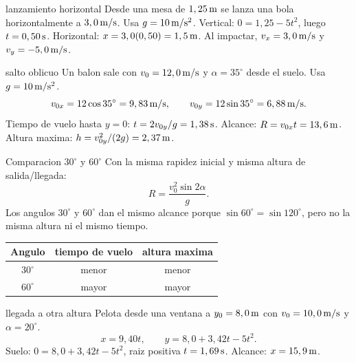 \documentclass[10pt,a4paper]{article}
\begin{document}
\begin{examplebox}{lanzamiento horizontal}
Desde una mesa de $1,25\,\mathrm{m}$ se lanza una bola horizontalmente a $3,0\,\mathrm{m/s}$. Usa $g=10\,\mathrm{m/s^2}$.
\solutionblock Vertical: $0=1,25-5t^2$, luego $t=0,50\,\mathrm{s}$. Horizontal: $x=3,0(0,50)=1,5\,\mathrm{m}$. Al impactar, $v_x=3,0\,\mathrm{m/s}$ y $v_y=-5,0\,\mathrm{m/s}$.
\end{examplebox}

\clearpage

\begin{examplebox}{salto oblicuo}
Un balon sale con $v_0=12,0\,\mathrm{m/s}$ y $\alpha=35^\circ$ desde el suelo. Usa $g=10\,\mathrm{m/s^2}$.
\solutionblock
\[
v_{0x}=12\cos35^\circ=9,83\,\mathrm{m/s},\qquad v_{0y}=12\sin35^\circ=6,88\,\mathrm{m/s}.
\]
Tiempo de vuelo hasta $y=0$: $t=2v_{0y}/g=1,38\,\mathrm{s}$. Alcance: $R=v_{0x}t=13,6\,\mathrm{m}$. Altura maxima: $h=v_{0y}^2/(2g)=2,37\,\mathrm{m}$.
\end{examplebox}

\begin{lessoncard}{Comparacion $30^\circ$ y $60^\circ$}
Con la misma rapidez inicial y misma altura de salida/llegada:
\[
R=\frac{v_0^2\sin 2\alpha}{g}.
\]
Los angulos $30^\circ$ y $60^\circ$ dan el mismo alcance porque $\sin60^\circ=\sin120^\circ$, pero no la misma altura ni el mismo tiempo.
\begin{center}
\begin{tabular}{@{}ccc@{}}
\toprule
Angulo & tiempo de vuelo & altura maxima\\
\midrule
$30^\circ$ & menor & menor\\
$60^\circ$ & mayor & mayor\\
\bottomrule
\end{tabular}
\end{center}
\end{lessoncard}

\begin{examplebox}{llegada a otra altura}
Pelota desde una ventana a $y_0=8,0\,\mathrm{m}$ con $v_0=10,0\,\mathrm{m/s}$ y $\alpha=20^\circ$.
\solutionblock
\[
x=9,40t,\qquad y=8,0+3,42t-5t^2.
\]
Suelo: $0=8,0+3,42t-5t^2$, raiz positiva $t=1,69\,\mathrm{s}$. Alcance: $x=15,9\,\mathrm{m}$.
\end{examplebox}
\end{document}
